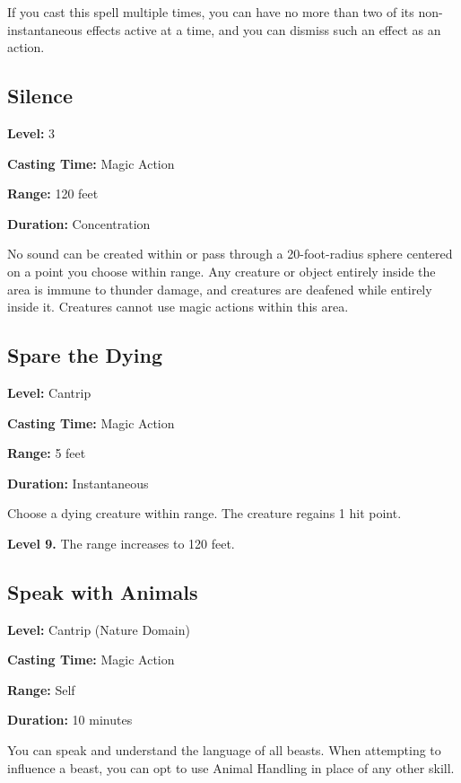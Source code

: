 \documentclass[12pt,letterpaper,twocolumn,openany,nodeprecatedcode,bg=none]{dndbook}
\begin{document}
If you cast this spell multiple times, you can have no more than two of
its non-instantaneous effects active at a time, and you can dismiss such
an effect as an action.

\clearpage

\subsection{Silence}\label{silence}

\textbf{Level:} 3

\textbf{Casting Time:} Magic Action

\textbf{Range:} 120 feet

\textbf{Duration:} Concentration

No sound can be created within or pass through a 20-foot-radius sphere
centered on a point you choose within range. Any creature or object
entirely inside the area is immune to thunder damage, and creatures are
deafened while entirely inside it. Creatures cannot use magic actions
within this area.

\subsection{Spare the Dying}\label{spare-the-dying}

\textbf{Level:} Cantrip

\textbf{Casting Time:} Magic Action

\textbf{Range:} 5 feet

\textbf{Duration:} Instantaneous

Choose a dying creature within range. The creature regains 1 hit point.

\textbf{Level 9.} The range increases to 120 feet.

\subsection{Speak with Animals}\label{speak-with-animals}

\textbf{Level:} Cantrip (Nature Domain)

\textbf{Casting Time:} Magic Action

\textbf{Range:} Self

\textbf{Duration:} 10 minutes

You can speak and understand the language of all beasts. When attempting
to influence a beast, you can opt to use Animal Handling in place of any
other skill.
\end{document}
